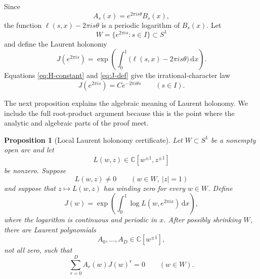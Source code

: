 \documentclass[reqno]{amsart}
\newtheorem{proposition}[theorem]{Proposition}
\theoremstyle{remark}
\numberwithin{equation}{section}
\newcommand{\C}{\mathbb{C}}
\newcommand{\dd}{\,\mathrm{d}}
\begin{document}
Since
\[
  A_s(x)=e^{2\pi i s\theta}B_s(x),
\]
the function \(\ell(s,x)-2\pi i s\theta\) is a periodic logarithm of
\(B_s(x)\). Let
\[
  W=\{e^{2\pi i s}:s\in I\}\subset S^1
\]
and define the Laurent holonomy
\begin{equation}
  J(e^{2\pi i s})
  =\exp\left(
    \int_0^1\bigl(\ell(s,x)-2\pi i s\theta\bigr)\dd x
  \right).
  \label{eq:J-def}
\end{equation}
Equations \eqref{eq:H-constant} and \eqref{eq:J-def} give the
irrational-character law
\begin{equation}
  J(e^{2\pi i s})=Ce^{-2\pi i\theta s}
  \qquad (s\in I).
  \label{eq:irrational-character-law}
\end{equation}

The next proposition explains the algebraic meaning of Laurent holonomy. We
include the full root-product argument because this is the point where the
analytic and algebraic parts of the proof meet.

\begin{proposition}[Local Laurent holonomy certificate]
\label{prop:laurent-holonomy}
Let \(W\subset S^1\) be a nonempty open arc and let
\[
  L(w,z)\in\C[w^{\pm1},z^{\pm1}]
\]
be nonzero. Suppose
\[
  L(w,z)\neq0
  \qquad (w\in W,\ |z|=1)
\]
and suppose that \(z\mapsto L(w,z)\) has winding zero for every \(w\in W\).
Define
\begin{equation}
  J(w)
  =\exp\left(
    \int_0^1\log L(w,e^{2\pi i x})\dd x
  \right),
  \label{eq:abstract-J}
\end{equation}
where the logarithm is continuous and periodic in \(x\). After possibly
shrinking \(W\), there are Laurent polynomials
\[
  A_0,\ldots,A_D\in\C[w^{\pm1}],
\]
not all zero, such that
\begin{equation}
  \sum_{r=0}^{D}A_r(w)J(w)^r=0
  \qquad (w\in W).
  \label{eq:laurent-certificate}
\end{equation}
\end{proposition}
\end{document}
